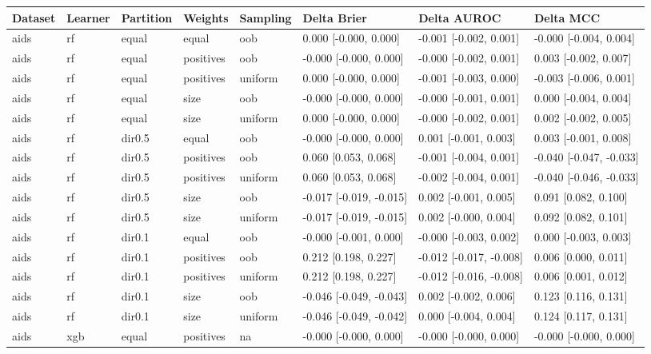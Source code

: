 \begin{tabular}{llllllll}
\toprule
Dataset & Learner & Partition & Weights & Sampling & Delta Brier & Delta AUROC & Delta MCC \\
\midrule
aids & rf & equal & equal & oob & 0.000 [-0.000, 0.000] & -0.001 [-0.002, 0.001] & -0.000 [-0.004, 0.004] \\
aids & rf & equal & positives & oob & -0.000 [-0.000, 0.000] & -0.000 [-0.002, 0.001] & 0.003 [-0.002, 0.007] \\
aids & rf & equal & positives & uniform & 0.000 [-0.000, 0.000] & -0.001 [-0.003, 0.000] & -0.003 [-0.006, 0.001] \\
aids & rf & equal & size & oob & -0.000 [-0.000, 0.000] & -0.000 [-0.001, 0.001] & 0.000 [-0.004, 0.004] \\
aids & rf & equal & size & uniform & 0.000 [-0.000, 0.000] & -0.000 [-0.002, 0.001] & 0.002 [-0.002, 0.005] \\
aids & rf & dir0.5 & equal & oob & -0.000 [-0.000, 0.000] & 0.001 [-0.001, 0.003] & 0.003 [-0.001, 0.008] \\
aids & rf & dir0.5 & positives & oob & 0.060 [0.053, 0.068] & -0.001 [-0.004, 0.001] & -0.040 [-0.047, -0.033] \\
aids & rf & dir0.5 & positives & uniform & 0.060 [0.053, 0.068] & -0.002 [-0.004, 0.001] & -0.040 [-0.046, -0.033] \\
aids & rf & dir0.5 & size & oob & -0.017 [-0.019, -0.015] & 0.002 [-0.001, 0.005] & 0.091 [0.082, 0.100] \\
aids & rf & dir0.5 & size & uniform & -0.017 [-0.019, -0.015] & 0.002 [-0.000, 0.004] & 0.092 [0.082, 0.101] \\
aids & rf & dir0.1 & equal & oob & -0.000 [-0.001, 0.000] & -0.000 [-0.003, 0.002] & 0.000 [-0.003, 0.003] \\
aids & rf & dir0.1 & positives & oob & 0.212 [0.198, 0.227] & -0.012 [-0.017, -0.008] & 0.006 [0.000, 0.011] \\
aids & rf & dir0.1 & positives & uniform & 0.212 [0.198, 0.227] & -0.012 [-0.016, -0.008] & 0.006 [0.001, 0.012] \\
aids & rf & dir0.1 & size & oob & -0.046 [-0.049, -0.043] & 0.002 [-0.002, 0.006] & 0.123 [0.116, 0.131] \\
aids & rf & dir0.1 & size & uniform & -0.046 [-0.049, -0.042] & 0.000 [-0.004, 0.004] & 0.124 [0.117, 0.131] \\
aids & xgb & equal & positives & na & -0.000 [-0.000, 0.000] & -0.000 [-0.000, 0.000] & -0.000 [-0.000, 0.000] \\

\end{tabular}
